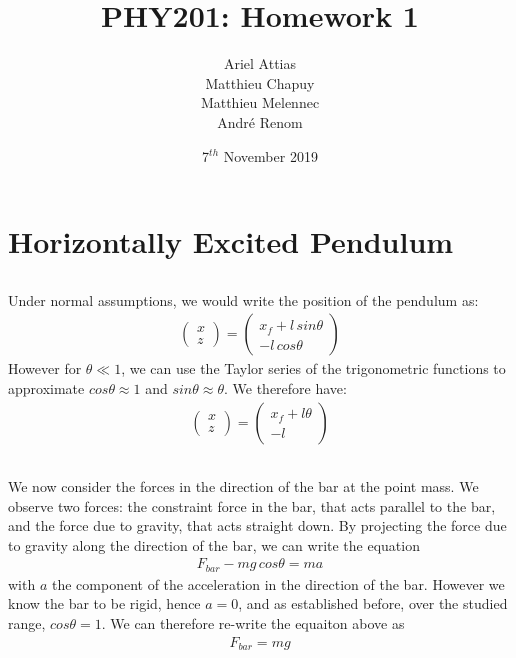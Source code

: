 \documentclass{article}
\title{PHY201: Homework 1}
\date{7$^{th}$ November 2019}
\author{Ariel Attias\\Matthieu Chapuy\\Matthieu Melennec\\Andr\'e Renom}
\begin{document}
	\maketitle
	\tableofcontents
	\newpage

\section{Horizontally Excited Pendulum}

\subsection{} %

Under normal assumptions, we would write the position of the pendulum as:
\begin{align*}
	\left( \begin{matrix} x \\ z \end{matrix} \right) = \left( \begin{matrix}x_f +  l\, sin\theta \\ -l\, cos\theta \end{matrix} \right)
\end{align*}
However for $\theta \ll 1$, we can use the Taylor series of the trigonometric functions to approximate $cos\theta \approx 1$ and $sin\theta \approx \theta$. We therefore have:
\begin{align*}
	\left( \begin{matrix} x \\ z \end{matrix} \right) = \left( \begin{matrix}x_f +  l\theta \\ -l \end{matrix} \right)
\end{align*}

\subsection{} %

We now consider the forces in the direction of the bar at the point mass. We observe two forces: the constraint force in the bar, that acts parallel to the bar, and the force due to gravity, that acts straight down. By projecting the force due to gravity along the direction of the bar, we can write the equation
\begin{align*}
	F_{bar} - mg\,cos\theta = ma
\end{align*}
with $a$ the component of the acceleration in the direction of the bar. However we know the bar to be rigid, hence $a = 0$, and as established before, over the studied range, $cos\theta = 1$. We can therefore re-write the equaiton above as
\begin{align*}
	F_{bar} = mg
\end{align*}
\end{document}

